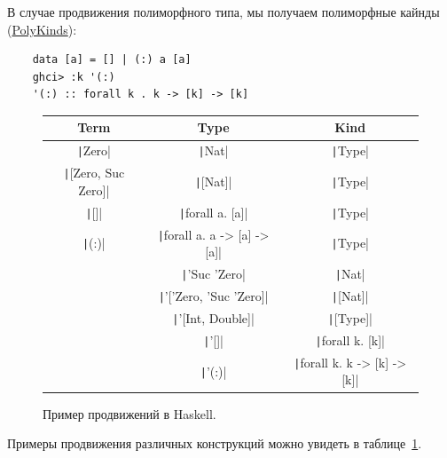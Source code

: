 В случае продвижения полиморфного типа, мы получаем полиморфные кайнды (\href{https://downloads.haskell.org/ghc/latest/docs/users_guide/exts/poly_kinds.html}{PolyKinds}):
\begin{verbatim}
    data [a] = [] | (:) a [a]
    ghci> :k '(:)
    '(:) :: forall k . k -> [k] -> [k]
\end{verbatim}

\begin{figure}[h]
    \centering
    \begin{tabular}{|c|c|c|}
        \hline
        Term                                   & Type                                            & Kind                                            \\
        \hline
        \texttt|Zero|             & \texttt|Nat|                       & \texttt|Type|                      \\
        \texttt|[Zero, Suc Zero]| & \texttt|[Nat]|                     & \texttt|Type|                      \\
        \texttt|[]|               & \texttt|forall a. [a]|             & \texttt|Type|                      \\
        \texttt|(:)|              & \texttt|forall a. a -> [a] -> [a]| & \texttt|Type|                      \\
        & \texttt|'Suc 'Zero|                & \texttt|Nat|                       \\
        & \texttt|'['Zero, 'Suc 'Zero]|      & \texttt|[Nat]|                     \\
        & \texttt|'[Int, Double]|            & \texttt|[Type]|                    \\
        & \texttt|'[]|                       & \texttt|forall k. [k]|             \\
        & \texttt|'(:)|                      & \texttt|forall k. k -> [k] -> [k]| \\
        \hline
    \end{tabular}
    \caption{Пример продвижений в Haskell.}
    \label{fig:universes}
\end{figure}

Примеры продвижения различных конструкций можно увидеть в таблице~\ref{fig:universes}.

